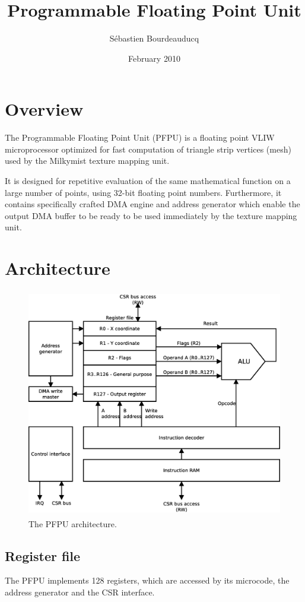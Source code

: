 \documentclass[a4paper,11pt]{article}
\title{Programmable Floating Point Unit}
\author{S\'ebastien Bourdeauducq}
\date{February 2010}
\begin{document}
\setlength{\parindent}{0pt}
\setlength{\parskip}{5pt}
\maketitle{}
\section{Overview}
The Programmable Floating Point Unit (PFPU) is a floating point VLIW microprocessor optimized for fast computation of triangle strip vertices (mesh) used by the Milkymist texture mapping unit.

It is designed for repetitive evaluation of the same mathematical function on a large number of points, using 32-bit floating point numbers. Furthermore, it contains specifically crafted DMA engine and address generator which enable the output DMA buffer to be ready to be used immediately by the texture mapping unit.

\section{Architecture}

\begin{figure}[H]
\centering
\includegraphics[height=100mm]{architecture.eps}
\caption{The PFPU architecture.}\label{fig:architecture}
\end{figure}

\subsection{Register file}
The PFPU implements 128 registers, which are accessed by its microcode, the address generator and the CSR interface.\\
\end{document}
